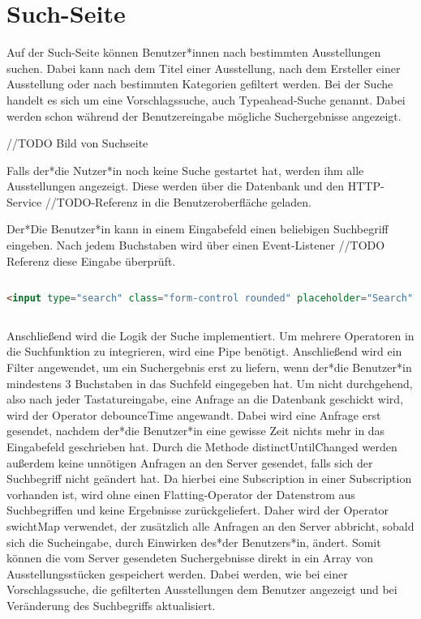 \section{Such-Seite}
Auf der Such-Seite können Benutzer*innen nach bestimmten Ausstellungen suchen. Dabei kann nach dem Titel einer Ausstellung, nach dem Ersteller einer Ausstellung oder nach bestimmten Kategorien gefiltert werden. Bei der Suche handelt es sich um eine Vorschlagssuche, auch Typeahead-Suche genannt. Dabei werden schon während der Benutzereingabe mögliche Suchergebnisse angezeigt.

//TODO Bild von Suchseite

Falls der*die Nutzer*in noch keine Suche gestartet hat, werden ihm alle Ausstellungen angezeigt. Diese werden über die Datenbank und den HTTP-Service //TODO-Referenz in die Benutzeroberfläche geladen. 

Der*Die Benutzer*in kann in einem Eingabefeld einen beliebigen Suchbegriff eingeben. Nach jedem Buchstaben wird über einen Event-Listener //TODO Referenz diese Eingabe überprüft. 

\begin{lstlisting}[caption={Eingabefeld},language=HTML]
    
<input type="search" class="form-control rounded" placeholder="Search" #input (keyup)="keyUp$.next(input.value)">
    
\end{lstlisting}

Anschließend wird die Logik der Suche implementiert. Um mehrere Operatoren in die Suchfunktion zu integrieren, wird eine Pipe benötigt. Anschließend wird ein Filter angewendet, um ein Suchergebnis erst zu liefern, wenn der*die Benutzer*in mindestens 3 Buchstaben in das Suchfeld eingegeben hat. Um nicht durchgehend, also nach jeder Tastatureingabe, eine Anfrage an die Datenbank geschickt wird, wird der Operator debounceTime angewandt. Dabei wird eine Anfrage erst gesendet, nachdem der*die Benutzer*in eine gewisse Zeit nichts mehr in das Eingabefeld geschrieben hat. Durch die Methode distinctUntilChanged werden außerdem keine unnötigen Anfragen an den Server gesendet, falls sich der Suchbegriff nicht geändert hat. Da hierbei eine Subscription in einer Subscription vorhanden ist, wird ohne einen Flatting-Operator der Datenstrom aus Suchbegriffen und keine Ergebnisse zurückgeliefert. Daher wird der Operator swichtMap verwendet, der zusätzlich alle Anfragen an den Server abbricht, sobald sich die Sucheingabe, durch Einwirken des*der Benutzers*in, ändert. Somit können die vom Server gesendeten Suchergebnisse direkt in ein Array von Ausstellungsstücken gespeichert werden. Dabei werden, wie bei einer Vorschlagssuche, die gefilterten Ausstellungen dem Benutzer angezeigt und bei Veränderung des Suchbegriffs aktualisiert.


